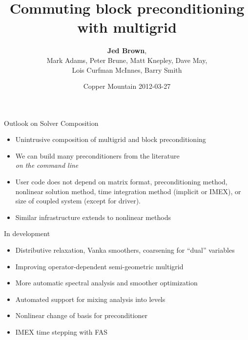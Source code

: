 \documentclass{beamer}
\title{Commuting block preconditioning with multigrid}
\author{{\bf Jed Brown}\inst{1},\\
Mark Adams\inst{2}, Peter Brune\inst{1}, Matt Knepley\inst{3}, Dave May\inst{4}, \\ Lois Curfman McInnes\inst{1}, Barry Smith\inst{1}}
\institute
{
  \inst{1}{Mathematics and Computer Science Division, Argonne National Laboratory} \\
  \inst{2}{Columbia University} \\
  \inst{3}{Computation Institute, University of Chicago} \\
  \inst{4}{ETH Z\"urich}
}
\date{Copper Mountain 2012-03-27}
\begin{document}
\lstset{language=C}
\normalem

\begin{frame}
  \titlepage
\end{frame}





















%






\begin{frame}{Outlook on Solver Composition}
  \begin{itemize}
  \item Unintrusive composition of multigrid and block preconditioning
  \item We can build many preconditioners from the literature \\
    \emph{on the command line}
  \item User code does not depend on matrix format, preconditioning method, nonlinear solution method, time integration method (implicit or IMEX), or size of coupled system (except for driver).
  \item Similar infrastructure extends to nonlinear methods
  \end{itemize}
  \begin{block}{In development}
    \begin{itemize}
    \item Distributive relaxation, Vanka smoothers, coarsening for ``dual'' variables
    \item Improving operator-dependent semi-geometric multigrid
    \item More automatic spectral analysis and smoother optimization
    \item Automated support for mixing analysis into levels
    \item Nonlinear change of basis for preconditioner
    \item IMEX time stepping with FAS
  \end{itemize}
\end{block}
\end{frame}
\end{document}
